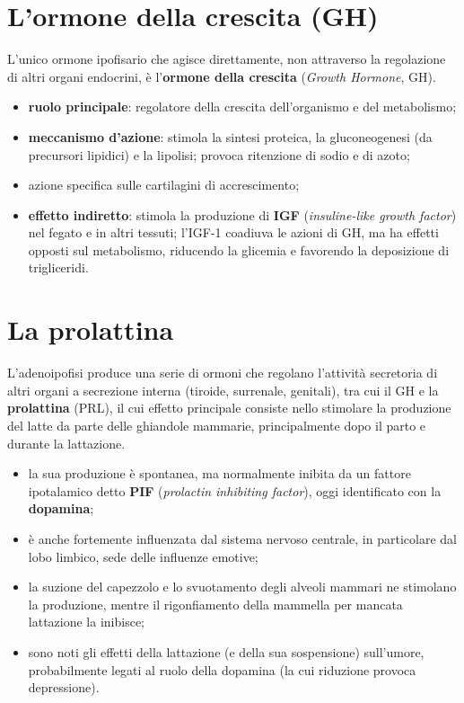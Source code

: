 \section{L'ormone della crescita (GH)}

L'unico ormone ipofisario che agisce direttamente, non attraverso la
regolazione di altri organi endocrini, è l'\textbf{ormone della crescita}
(\textit{Growth Hormone}, GH).

\begin{itemize}
  \item \textbf{ruolo principale}: regolatore della crescita dell'organismo
    e del metabolismo;
  \item \textbf{meccanismo d'azione}: stimola la sintesi proteica, la
    gluconeogenesi (da precursori lipidici) e la lipolisi; provoca
    ritenzione di sodio e di azoto;
  \item azione specifica sulle cartilagini di accrescimento;
  \item \textbf{effetto indiretto}: stimola la produzione di \textbf{IGF}
    (\textit{insuline-like growth factor}) nel fegato e in altri tessuti;
    l'IGF-1 coadiuva le azioni di GH, ma ha effetti opposti sul metabolismo,
    riducendo la glicemia e favorendo la deposizione di trigliceridi.
\end{itemize}

\section{La prolattina}

L'adenoipofisi produce una serie di ormoni che regolano l'attività
secretoria di altri organi a secrezione interna (tiroide, surrenale,
genitali), tra cui il GH e la \textbf{prolattina} (PRL), il cui effetto
principale consiste nello stimolare la produzione del latte da parte delle
ghiandole mammarie, principalmente dopo il parto e durante la lattazione.

\begin{itemize}
  \item la sua produzione è spontanea, ma normalmente inibita da un fattore
    ipotalamico detto \textbf{PIF} (\textit{prolactin inhibiting factor}),
    oggi identificato con la \textbf{dopamina};
  \item è anche fortemente influenzata dal sistema nervoso centrale, in
    particolare dal lobo limbico, sede delle influenze emotive;
  \item la suzione del capezzolo e lo svuotamento degli alveoli mammari ne
    stimolano la produzione, mentre il rigonfiamento della mammella per
    mancata lattazione la inibisce;
  \item sono noti gli effetti della lattazione (e della sua sospensione)
    sull'umore, probabilmente legati al ruolo della dopamina (la cui
    riduzione provoca depressione).
\end{itemize}


